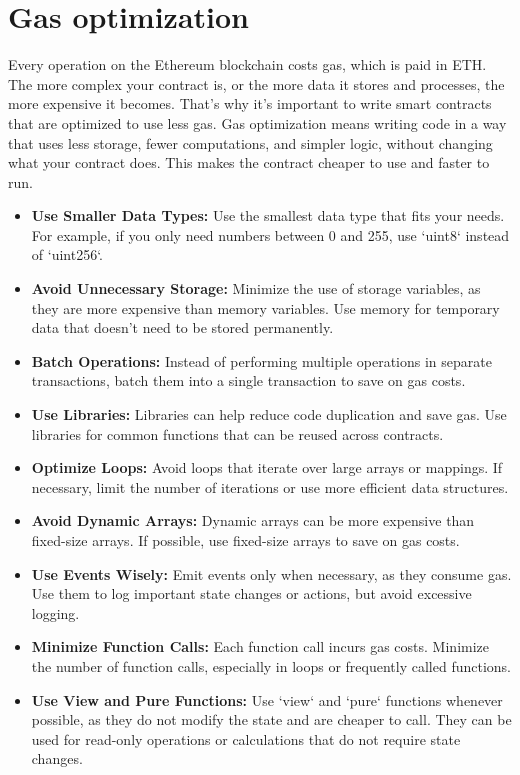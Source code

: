 \documentclass[12pt, a4paper]{article}
\begin{document}
\section{Gas optimization}
Every operation on the Ethereum blockchain costs gas, which is paid in ETH. The more complex your contract is, or the more data it stores and processes, the more expensive it becomes. That’s why it’s important to write smart contracts that are optimized to use less gas. Gas optimization means writing code in a way that uses less storage, fewer computations, and simpler logic, without changing what your contract does. This makes the contract cheaper to use and faster to run.
\begin{itemize}
    \item \textbf{Use Smaller Data Types:} Use the smallest data type that fits your needs. For example, if you only need numbers between 0 and 255, use `uint8` instead of `uint256`.
    \item \textbf{Avoid Unnecessary Storage:} Minimize the use of storage variables, as they are more expensive than memory variables. Use memory for temporary data that doesn’t need to be stored permanently.
    \item \textbf{Batch Operations:} Instead of performing multiple operations in separate transactions, batch them into a single transaction to save on gas costs.
    \item \textbf{Use Libraries:} Libraries can help reduce code duplication and save gas. Use libraries for common functions that can be reused across contracts.
    \item \textbf{Optimize Loops:} Avoid loops that iterate over large arrays or mappings. If necessary, limit the number of iterations or use more efficient data structures.
    \item \textbf{Avoid Dynamic Arrays:} Dynamic arrays can be more expensive than fixed-size arrays. If possible, use fixed-size arrays to save on gas costs.
    \item \textbf{Use Events Wisely:} Emit events only when necessary, as they consume gas. Use them to log important state changes or actions, but avoid excessive logging.
    \item \textbf{Minimize Function Calls:} Each function call incurs gas costs. Minimize the number of function calls, especially in loops or frequently called functions.
    \item \textbf{Use View and Pure Functions:} Use `view` and `pure` functions whenever possible, as they do not modify the state and are cheaper to call. They can be used for read-only operations or calculations that do not require state changes.

\end{itemize}
\end{document}
